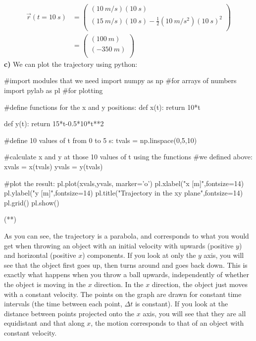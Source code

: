 \begin{example}
\begin{align*}
\vec r(t=\SI{10}{s})&= \begin{pmatrix}
           (\SI{10}{m/s})(\SI{10}{s}) \\
           (\SI{15}{m/s})(\SI{10}{s})-\frac{1}{2}(\SI{10}{m/s^2})(\SI{10}{s})^2 \\
         \end{pmatrix}\\
         &= \begin{pmatrix}
           (\SI{100}{m}) \\
           (\SI{-350}{m})\\
         \end{pmatrix}
\end{align*}
\textbf{c)} We can plot the trajectory using python:

\begin{python}[caption=Trajectory in xy plane]
#import modules that we need
import numpy as np #for arrays of numbers
import pylab as pl #for plotting

#define functions for the x and y positions:
def x(t):
    return 10*t

def y(t):
    return 15*t-0.5*10*t**2

#define 10 values of t from 0 to 5 s:
tvals = np.linspace(0,5,10)

#calculate x and y at those 10 values of t using the functions
#we defined above:
xvals = x(tvals)
yvals = y(tvals)

#plot the result:
pl.plot(xvals,yvals, marker='o')
pl.xlabel("x [m]",fontsize=14)
pl.ylabel("y [m]",fontsize=14)
pl.title("Trajectory in the xy plane",fontsize=14)
pl.grid()
pl.show()
\end{python}
\begin{poutput}
(**)
\end{poutput}
As you can see, the trajectory is a parabola, and corresponds to what you would get when throwing an object with an initial velocity with upwards (positive $y$) and horizontal (positive $x$) components. If you look at only the $y$ axis, you will see that the object first goes up, then turns around and goes back down. This is exactly what happens when you throw a ball upwards, independently of whether the object is moving in the $x$ direction. In the $x$ direction, the object just moves with a constant velocity. The points on the graph are drawn for constant time intervals (the time between each point, $\Delta t$ is constant). If you look at the distance between points projected onto the $x$ axis, you will see that they are all equidistant and that along $x$, the motion corresponds to that of an object with constant velocity. 
\end{example}

